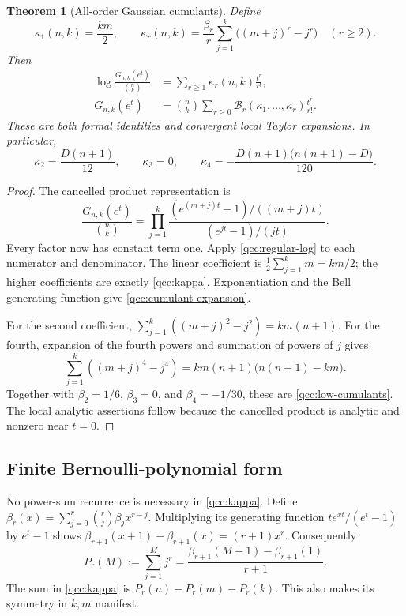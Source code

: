 \documentclass[11pt,a4paper,oneside,openany]{book}
\newtheorem{theorem}{Theorem}[chapter]
\theoremstyle{definition}
\theoremstyle{remark}
\newcommand{\Y}[1]{\mathcal B_{#1}}
\begin{document}
\begin{theorem}[All-order Gaussian cumulants]
\label{qcc:cumulants}
Define
\begin{equation}\label{qcc:kappa}
 \kappa_1(n,k)=\frac{km}{2},\qquad
 \kappa_r(n,k)=\frac{\beta_r}{r}
       \sum_{j=1}^{k}\bigl((m+j)^r-j^r\bigr)\quad(r\ge2).
\end{equation}
Then
\begin{align}
 \log\frac{G_{n,k}(e^t)}{\binom nk}
   &=\sum_{r\ge1}\kappa_r(n,k)\frac{t^r}{r!},
       \label{qcc:log-cumulants}\\
 G_{n,k}(e^t)
   &=\binom nk\sum_{r\ge0}
      \Y r(\kappa_1,\ldots,\kappa_r)\frac{t^r}{r!}.
       \label{qcc:cumulant-expansion}
\end{align}
These are both formal identities and convergent local Taylor expansions.
In particular,
\begin{equation}\label{qcc:low-cumulants}
 \kappa_2=\frac{D(n+1)}{12},\qquad
 \kappa_3=0,\qquad
 \kappa_4=-\frac{D(n+1)\bigl(n(n+1)-D\bigr)}{120}.
\end{equation}
\end{theorem}
\begin{proof}
The cancelled product representation is
\[
 \frac{G_{n,k}(e^t)}{\binom nk}
 =\prod_{j=1}^{k}
 \frac{(e^{(m+j)t}-1)/((m+j)t)}{(e^{jt}-1)/(jt)}.
\]
Every factor now has constant term one. Apply
\cref{qcc:regular-log} to each numerator and denominator. The linear
coefficient is \(\frac12\sum_{j=1}^k m=km/2\); the higher coefficients
are exactly \eqref{qcc:kappa}. Exponentiation and the Bell generating
function give \eqref{qcc:cumulant-expansion}.

For the second coefficient,
\(\sum_{j=1}^k((m+j)^2-j^2)=km(n+1)\). For the fourth,
expansion of the fourth powers and summation of powers of \(j\) gives
\[
 \sum_{j=1}^k((m+j)^4-j^4)
 =km(n+1)\bigl(n(n+1)-km\bigr).
\]
Together with \(\beta_2=1/6\), \(\beta_3=0\), and \(\beta_4=-1/30\),
these are \eqref{qcc:low-cumulants}. The local analytic assertions follow
because the cancelled product is analytic and nonzero near \(t=0\).
\end{proof}

\subsection{Finite Bernoulli-polynomial form}
No power-sum recurrence is necessary in \eqref{qcc:kappa}. Define
\(\beta_r(x)=\sum_{j=0}^r\binom rj\beta_jx^{r-j}\). Multiplying its
generating function \(te^{xt}/(e^t-1)\) by \(e^t-1\) shows
\(\beta_{r+1}(x+1)-\beta_{r+1}(x)=(r+1)x^r\). Consequently
\[
 P_r(M):=\sum_{j=1}^{M}j^r
   =\frac{\beta_{r+1}(M+1)-\beta_{r+1}(1)}{r+1}.
\]
The sum in \eqref{qcc:kappa} is \(P_r(n)-P_r(m)-P_r(k)\).
This also makes its symmetry in \(k,m\) manifest.
\end{document}
